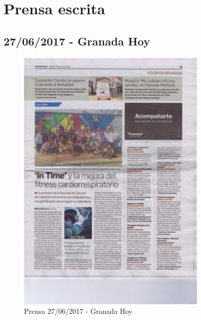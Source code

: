 \newpage

\section{Prensa escrita}

\subsection{27/06/2017 - Granada Hoy}
\begin{figure}[ht]
	\centering
	\includegraphics[width=0.8\textwidth]{prensa/GRANADA_HOY_27_06_2017_b.png}
	\caption{Prensa 27/06/2017 - Granada Hoy}
	\label{prensa1}
\end{figure}

\newpage

